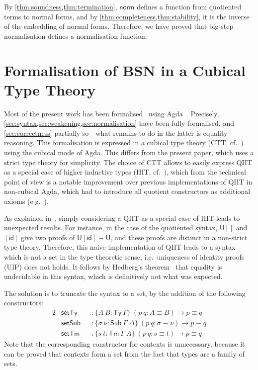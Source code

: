 \documentclass[a4paper,UKenglish,cleveref]{lipics-v2019}
\newcommand{\agdaSymb}[1]{\mathsf{#1}}
\newcommand{\Ty}{\agdaSymb{Ty}}
\newcommand{\Tms}{\agdaSymb{Sub}}
\newcommand{\Tm}{\agdaSymb{Tm}}
\newcommand{\id}{\agdaSymb{id}}
\newcommand{\norm}{\agdaSymb{norm}}
\newcommand{\U}{\agdaSymb{U}}
\newcommand{\isSet}{\agdaSymb{set}}
\begin{document}
By \cref{thm:soundness,thm:termination}, $\norm$ defines a
function from quotiented terms to normal forms, and by
\cref{thm:completeness,thm:stability}, it is the inverse of
the embedding of normal forms. Therefore, we have proved that big step
normalisation defines a normalisation function.

\section{Formalisation of BSN in a Cubical Type Theory}
\label{sec:cubical}
Most of the present work has been formalised~\cite{formalisation} using
Agda~\cite{norell2007agda}. Precisely, \cref{sec:syntax,sec:weakening,sec:normalisation}
have been fully formalised, and \cref{sec:correctness} partially so---what
remains to do in the latter is equality reasoning.
This formalisation is expressed in a cubical type theory (CTT, cf.~\cite{cchm})
using the cubical mode of Agda. This differs from the present paper, which
uses a strict type theory for simplicity. The choice of CTT allows to easily
express QIIT as a special case of higher inductive types (HIT, cf.~\cite{hott}),
which from the technical point of view is a notable improvement over previous
implementations of QIIT in non-cubical Agda, which had to introduce all quotient
constructors as additional axioms (e.g.~\cite{kaposi2016normalisation,kaposi2016type}).

As explained in~\cite{kaposi2016type}, simply considering a QIIT as a special
case of HIT leads to unexpected results. For instance, in the case of the
quotiented syntax, $\U[]$ and $[\id]$ give two proofs of $\U[\id] \equiv \U$,
and these proofs are distinct in a non-strict type theory. Therefore, this naive
implementation of QIIT leads to a syntax which is not a set in the type theoretic
sense, i.e.\ uniqueness of identity proofs (UIP) does not holds.
It follows by Hedberg's theorem~\cite{hedberg1998coherence} that equality is
undecidable in this syntax, which is definitively not what was expected.

The solution is to truncate the syntax to a set, by the addition of the
following constructors:
\begin{alignat*}{2}
  & \isSet\Ty && : \{A\ B : \Ty\ \Gamma\}\ (p\ q : A \equiv B) \to p \equiv q \\
  & \isSet\Tms && : \{\sigma\ \nu : \Tms\ \Gamma\ \Delta\}\ (p\ q : \sigma \equiv \nu) \to p \equiv q \\
  & \isSet\Tm && : \{s\ t : \Tm\ \Gamma\ A\}\ (p\ q : s \equiv t) \to p \equiv q
\end{alignat*}
Note that the corresponding constructor for contexts is unnecessary, because
it can be proved that contexts form a set from the fact that types are a
family of sets.
\end{document}
